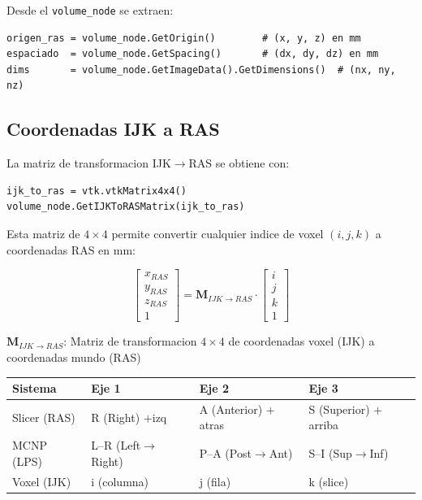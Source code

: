 \documentclass[12pt,a4paper]{article}
\newcommand{\vardef}[2]{\noindent\textbf{#1}: #2\\}
\begin{document}
Desde el \texttt{volume\_node} se extraen:

\begin{verbatim}
origen_ras = volume_node.GetOrigin()        # (x, y, z) en mm
espaciado  = volume_node.GetSpacing()       # (dx, dy, dz) en mm
dims       = volume_node.GetImageData().GetDimensions()  # (nx, ny, nz)
\end{verbatim}

\subsection{Coordenadas IJK a RAS}

La matriz de transformacion IJK$\to$RAS se obtiene con:

\begin{verbatim}
ijk_to_ras = vtk.vtkMatrix4x4()
volume_node.GetIJKToRASMatrix(ijk_to_ras)
\end{verbatim}

Esta matriz de $4 \times 4$ permite convertir cualquier indice de voxel $(i,j,k)$ a coordenadas RAS en mm:

$$
\begin{bmatrix} x_{RAS} \\ y_{RAS} \\ z_{RAS} \\ 1 \end{bmatrix}
= \mathbf{M}_{IJK \to RAS} \cdot \begin{bmatrix} i \\ j \\ k \\ 1 \end{bmatrix}
$$

\vardef{$\mathbf{M}_{IJK \to RAS}$}{Matriz de transformacion $4\times4$ de coordenadas voxel (IJK) a coordenadas mundo (RAS)}

\begin{center}
\begin{tabular}{llll}
\toprule
\textbf{Sistema} & \textbf{Eje 1} & \textbf{Eje 2} & \textbf{Eje 3} \\
\midrule
Slicer (RAS) & R (Right) $+$izq & A (Anterior) $+$atras & S (Superior) $+$arriba \\
MCNP (LPS) & L--R (Left$\to$Right) & P--A (Post$\to$Ant) & S--I (Sup$\to$Inf) \\
Voxel (IJK) & i (columna) & j (fila) & k (slice) \\
\bottomrule
\end{tabular}
\end{center}
\end{document}
